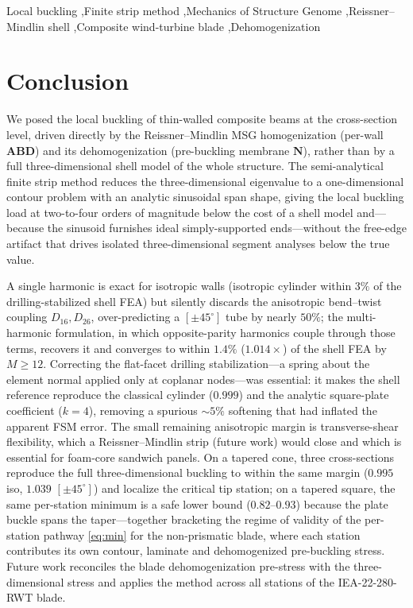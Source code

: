 \documentclass[preprint,12pt]{elsarticle}
\newcommand{\NN}{\mathbf{N}}
\newcommand{\ABD}{\mathbf{ABD}}
\begin{document}
\begin{frontmatter}
\begin{keyword}
Local buckling \sep Finite strip method \sep Mechanics of Structure Genome \sep Reissner--Mindlin shell
\sep Composite wind-turbine blade \sep Dehomogenization
\end{keyword}
\end{frontmatter}




\section{Conclusion}\label{sec:concl}
We posed the local buckling of thin-walled composite beams at the cross-section level, driven directly by
the Reissner--Mindlin MSG homogenization (per-wall $\ABD$) and its dehomogenization (pre-buckling membrane
$\NN$), rather than by a full three-dimensional shell model of the whole structure. The semi-analytical
finite strip method reduces the three-dimensional eigenvalue to a one-dimensional contour problem with an
analytic sinusoidal span shape, giving the local buckling load at two-to-four orders of magnitude below the
cost of a shell model and---because the sinusoid furnishes ideal simply-supported ends---without the
free-edge artifact that drives isolated three-dimensional segment analyses below the true value.

A single harmonic is exact for isotropic walls (isotropic cylinder within $3\%$ of the drilling-stabilized
shell FEA) but silently discards the anisotropic bend--twist coupling $D_{16},D_{26}$, over-predicting a
$[\pm45^\circ]$ tube by nearly $50\%$; the multi-harmonic formulation, in which opposite-parity harmonics
couple through those terms, recovers it and converges to within $1.4\%$ ($1.014\times$) of the shell FEA by
$M\!\ge\!12$. Correcting the flat-facet drilling stabilization---a spring about the element normal applied
only at coplanar nodes---was essential: it makes the shell reference reproduce the classical cylinder
($0.999$) and the analytic square-plate coefficient ($k=4$), removing a spurious $\sim\!5\%$ softening that
had inflated the apparent FSM error. The small remaining anisotropic margin is transverse-shear flexibility,
which a Reissner--Mindlin strip (future work) would close and which is essential for foam-core sandwich
panels. On a tapered cone, three cross-sections reproduce the full three-dimensional buckling to within the
same margin ($0.995$ iso, $1.039$ $[\pm45^\circ]$) and localize the critical tip station; on a tapered
square, the same per-station minimum is a safe lower bound ($0.82$--$0.93$) because the plate buckle spans
the taper---together bracketing the regime of validity of the per-station pathway \eqref{eq:min} for the
non-prismatic blade, where each station contributes its own contour, laminate and dehomogenized pre-buckling
stress. Future work reconciles the blade dehomogenization pre-stress with the three-dimensional stress and
applies the method across all stations of the IEA-22-280-RWT blade.



\end{document}
